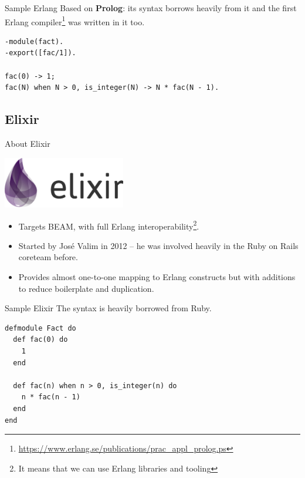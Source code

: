 \documentclass[12pt]{beamer}
\begin{document}
\begin{frame}[fragile]{Sample Erlang}
  Based on \textbf{Prolog}: its syntax borrows heavily from it and the first Erlang compiler\footnote{\url{https://www.erlang.se/publications/prac_appl_prolog.ps}} was written in it too.
  \begin{verbatim}
-module(fact).
-export([fac/1]).

fac(0) -> 1;
fac(N) when N > 0, is_integer(N) -> N * fac(N - 1).
  \end{verbatim}
\end{frame}

\subsection{Elixir}
\begin{frame}{About Elixir}
  \begin{center}
    \includegraphics[width=0.4\textwidth]{elixir}
  \end{center}
  \begin{itemize}
    \item Targets BEAM, with full Erlang interoperability\footnote{It means that we can use Erlang libraries and tooling}.
    \item Started by Jos\'{e} Valim in 2012 -- he was involved heavily in the Ruby on Rails coreteam before.
    \item Provides almost one-to-one mapping to Erlang constructs but with additions to reduce boilerplate and duplication.
  \end{itemize}
\end{frame}

\begin{frame}[fragile]{Sample Elixir}
  The syntax is heavily borrowed from Ruby.
  \begin{verbatim}
defmodule Fact do
  def fac(0) do
    1
  end

  def fac(n) when n > 0, is_integer(n) do
    n * fac(n - 1)
  end
end
  \end{verbatim}
\end{frame}
\end{document}
